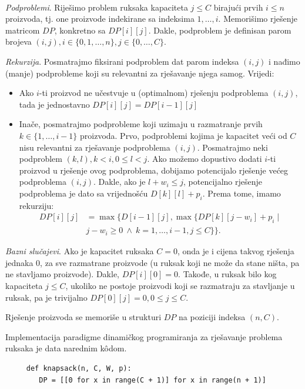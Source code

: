 \begin{solution}
	\\
	\textit{Podproblemi}. Riješimo problem ruksaka kapaciteta $j\leq C$ birajući prvih $i\leq n$ proizvoda, tj. one proizvode indekirane sa indeksima $1, \ldots , i$.  Memorišimo rješenje matricom $DP$, konkretno sa $DP[i ][j]$. Dakle, podproblem je definisan parom brojeva $(i,j), i\in \{0, 1, \ldots, n\}, j \in \{0, \ldots, C \}$. 
	
	\textit{Rekurzija}. Posmatrajmo fiksirani podproblem dat parom indeksa $(i, j)$ i nađimo  (manje) podprobleme koji su relevantni za rješavanje njega samog. Vrijedi:
	
	\begin{itemize}
		\item Ako $i$-ti proizvod ne učestvuje u (optimalnom) rješenju podproblema $(i, j)$, tada je jednostavno $DP[i][j] = DP[i-1][j]  $
		\item     Inače, posmatrajmo podprobleme koji uzimaju u razmatranje prvih $k\in \{1, \ldots, i-1\}$ proizvoda. Prvo, podproblemi kojima je kapacitet veći od $C$ nisu relevantni za rješavanje podproblema $(i,j)$. Posmatrajmo neki podproblem $(k,l), k < i, 0 \leq l < j$. Ako možemo dopustivo dodati $i$-ti proizvod u rješenje ovog podproblema, dobijamo potencijalo rješenje većeg podproblema $(i,j)$. Dakle, ako je $l + w_i \leq j$, potencijalno rješenje podproblema je dato sa vrijednošću $D[k][l] + p_i$.  Prema tome, imamo rekurziju:
	   \begin{align*}
		      DP[i ][j ]& = \max\{ D[i-1][j], \max\{DP[k][j - w_i ] + p_i \mid   \\   & j - w_i \geq  0 \ \wedge\  k=1, \ldots, i-1, j \leq C\}\}.
		\end{align*}
	\end{itemize}
	
	 \textit{ Bazni slučajevi}. Ako je kapacitet ruksaka $C=0$, onda je i cijena takvog rješenja jednaka 0, za sve razmatrane proizvode (u ruksak koji ne može da stane ništa, pa ne  stavljamo proizvode). Dakle, $DP[i][0] = 0.$ Takođe, u ruksak bilo kog kapaciteta $j \leq C$, ukoliko ne postoje proizvodi koji se razmatraju za stavljanje u ruksak, pa je trivijalno $DP[0][j] = 0, 0 \leq j \leq C$.
	 
	 Rješenje proizvoda se memoriše u strukturi $DP$ na poziciji indeksa $(n, C)$.
	 
	 Implementacija paradigme dinamičkog programiranja za rješavanje problema ruksaka je data narednim k\^odom.
	 
	 \begin{verbatim}
	 def knapsack(n, C, W, p):
	 	DP = [[0 for x in range(C + 1)] for x in range(n + 1)]
	 

\end{verbatim}
\end{solution}
